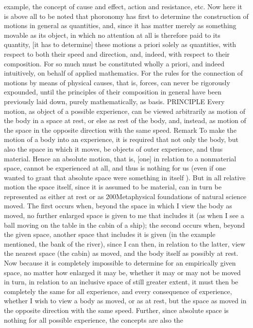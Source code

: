 example, the concept of cause and effect, action and resistance, etc. Now
here it is above all to be noted that phoronomy has ﬁrst to determine the
construction of motions in general as quantities, and, since it has matter
merely as something movable as its object, in which no attention at all
is therefore paid to its quantity, [it has to determine] these motions a
priori solely as quantities, with respect to both their speed and direction,
and, indeed, with respect to their composition. For so much must be
constituted wholly a priori, and indeed intuitively, on behalf of applied
mathematics. For the rules for the connection of motions by means of
physical causes, that is, forces, can never be rigorously expounded, until
the principles of their composition in general have been previously laid
down, purely mathematically, as basis.
PRINCIPLE
Every motion, as object of a possible experience, can be viewed arbitrarily
as motion of the body in a space at rest, or else as rest of the body, and,
instead, as motion of the space in the opposite direction with the same
speed.
Remark
To make the motion of a body into an experience, it is required that not
only the body, but also the space in which it moves, be objects of outer
experience, and thus material. Hence an absolute motion, that is, [one]
in relation to a nonmaterial space, cannot be experienced at all, and thus
is nothing for us (even if one wanted to grant that absolute space were
something in itself ). But in all relative motion the space itself, since it is
assumed to be material, can in turn be represented as either at rest or as
200Metaphysical foundations of natural science
moved. The ﬁrst occurs when, beyond the space in which I view the body
as moved, no further enlarged space is given to me that includes it (as
when I see a ball moving on the table in the cabin of a ship); the second
occurs when, beyond the given space, another space that includes it is
given (in the example mentioned, the bank of the river), since I can then,
in relation to the latter, view the nearest space (the cabin) as moved, and
the body itself as possibly at rest. Now because it is completely impossible
to determine for an empirically given space, no matter how enlarged it
may be, whether it may or may not be moved in turn, in relation to
an inclusive space of still greater extent, it must then be completely the
same for all experience, and every consequence of experience, whether
I wish to view a body as moved, or as at rest, but the space as moved
in the opposite direction with the same speed. Further, since absolute
space is nothing for all possible experience, the concepts are also the
